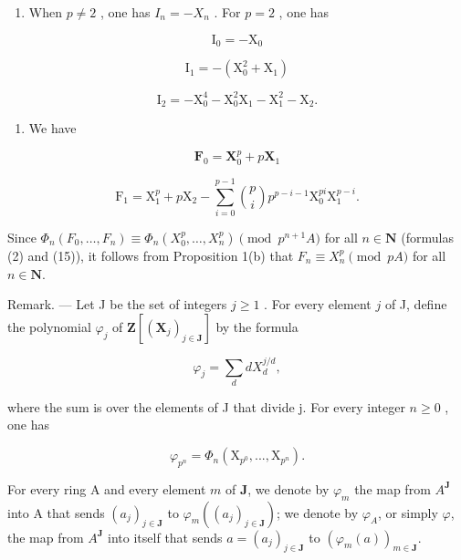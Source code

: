 \begin{enumerate}
\def\labelenumi{\arabic{enumi})}
\setcounter{enumi}{2}
\tightlist
\item
  When \(p \neq 2\) , one has \(I_n = -X_n\) . For \(p = 2\) , one has
\end{enumerate}

\[
\mathrm{I} _ {0} = - \mathrm{X} _ {0}
\]

\[
\mathrm{I} _ {1} = - \left(\mathrm{X} _ {0} ^ {2} + \mathrm{X} _ {1}\right)
\]

\[
\mathrm{I} _ {2} = - \mathrm{X} _ {0} ^ {4} - \mathrm{X} _ {0} ^ {2} \mathrm{X} _ {1} - \mathrm{X} _ {1} ^ {2} - \mathrm{X} _ {2}.
\]

\begin{enumerate}
\def\labelenumi{\arabic{enumi})}
\setcounter{enumi}{3}
\tightlist
\item
  We have
\end{enumerate}

\[
\mathbf {F} _ {0} = \mathbf {X} _ {0} ^ {p} + p \mathbf {X} _ {1}
\]

\[
\mathrm{F} _ {1} = \mathrm{X} _ {1} ^ {p} + p \mathrm{X} _ {2} - \sum_ {i = 0} ^ {p - 1} \binom {p} {i} p ^ {p - i - 1} \mathrm{X} _ {0} ^ {p i} \mathrm{X} _ {1} ^ {p - i}.
\]

Since \(\Phi_n(F_0, \ldots, F_n) \equiv \Phi_n(X_0^p, \ldots, X_n^p) \pmod{p^{n+1}A}\) for all \(n \in \mathbf{N}\) (formulas (2) and (15)), it follows from Proposition 1(b) that \(F_n \equiv X_n^p \pmod{pA}\) for all \(n \in \mathbf{N}\).

Remark. --- Let J be the set of integers \(j \geqslant 1\) . For every element \(j\) of J, define the polynomial \(\varphi_j\) of \(\mathbf{Z}[(\mathbf{X}_j)_{j \in \mathbf{J}}]\) by the formula

\[
\varphi_ {j} = \sum_ {d} d X _ {d} ^ {j / d},
\]

where the sum is over the elements of J that divide j. For every integer \(n \geqslant 0\) , one has

\[
\varphi_ {p ^ {n}} = \Phi_ {n} (\mathrm{X} _ {p ^ {0}},..., \mathrm{X} _ {p ^ {n}}).
\]

For every ring A and every element \(m\) of \(\mathbf{J}\), we denote by \(\varphi_{m}\) the map from \(A^{\mathbf{J}}\) into A that sends \((a_{j})_{j\in\mathbf{J}}\) to \(\varphi_{m}((a_{j})_{j\in\mathbf{J}})\); we denote by \(\varphi_{A}\), or simply \(\varphi\), the map from \(A^{\mathbf{J}}\) into itself that sends \(a = (a_{j})_{j\in\mathbf{J}}\) to \((\varphi_{m}(a))_{m\in\mathbf{J}}\).

